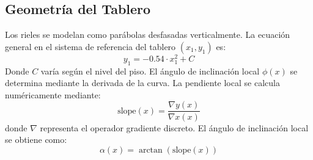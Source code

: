 \documentclass[
A4paper,            1 paper size A4
oneside,            %
openright,          %
10pt,               %
headings=normal,    %
titlepage=on        %
]{article}
\begin{document}
\subsection{Geometría del Tablero}
Los rieles se modelan como parábolas desfasadas verticalmente. La ecuación general en el sistema de referencia del tablero $(x_1, y_1)$ es:
\begin{equation}
    y_1 = -0.54 \cdot x_1^2 + C
\end{equation}
Donde $C$ varía según el nivel del piso. El ángulo de inclinación local $\phi(x)$ se determina mediante la derivada de la curva. La pendiente local se calcula numéricamente mediante:
\begin{equation}
    \text{slope}(x) = \frac{\nabla y(x)}{\nabla x(x)}
\end{equation}
donde $\nabla$ representa el operador gradiente discreto. El ángulo de inclinación local se obtiene como:
\begin{equation}
    \alpha(x) = \arctan(\text{slope}(x))
\end{equation}
\end{document}
